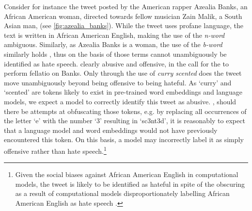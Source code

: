 Consider for instance the tweet posted by the American rapper Azealia Banks, an African American woman, directed towards fellow musician Zain Malik, a South Asian man, (see \autoref{fig:azealia_banks}).
While the tweet uses profane language, the text is written in African American English, making the use of the \textit{n-word} ambiguous.
Similarly, as Azealia Banks is a woman, the use of the \textit{b-word} similarly holds , thus on the basis of those terms  cannot unambiguously be identified as hate speech.
 clearly  abusive and offensive, in the call for the  to perform fellatio on Banks.
Only through the use of \textit{curry scented} does the tweet move unambiguously beyond  being offensive to being hateful.
As `curry' and `scented' are tokens likely to exist in pre-trained word embeddings and language models, we  expect a model to correctly identify this tweet as abusive.
, should there be attempts at obfuscating those tokens, e.g. by replacing all occurrences of the letter `e' with the number `$3$' resulting in `sc3nt3d', it is reasonably to expect that a language model and word embeddings would not have previously encountered this token. 
On this basis, a model may incorrectly label it as simply offensive rather than hate speech.\footnote{Given the social biases against African American English in computational models, the tweet is likely to be identified as hateful in spite of the obscuring as a result of computational models disproportionately labelling African American English as hate speech \citep{Davidson:2019}.}

